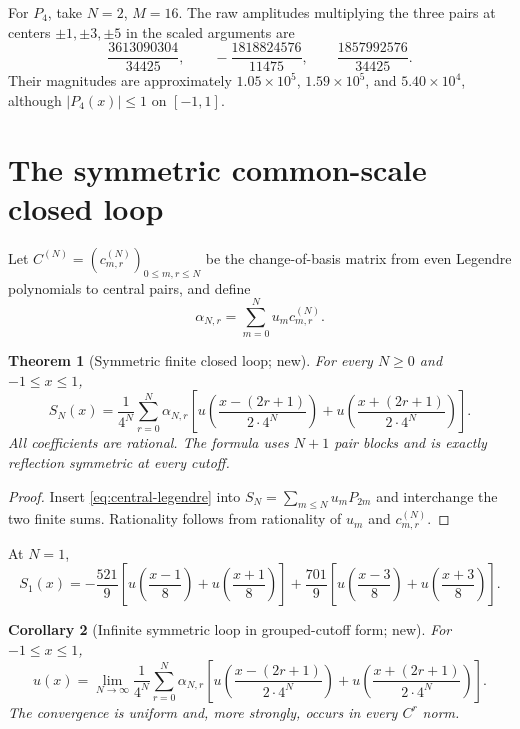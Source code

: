 \documentclass[11pt,oneside]{article}
\numberwithin{equation}{section}
\newtheorem{theorem}{Theorem}[section]
\newtheorem{corollary}[theorem]{Corollary}
\theoremstyle{definition}
\theoremstyle{remark}
\begin{document}
For $P_4$, take $N=2$, $M=16$.  The raw amplitudes multiplying the three
pairs at centers $\pm1,\pm3,\pm5$ in the scaled arguments are
\begin{equation}
 \frac{3613090304}{34425},\qquad
 -\frac{1818824576}{11475},\qquad
 \frac{1857992576}{34425}.
 \label{eq:P4-central-coeffs}
\end{equation}
Their magnitudes are approximately $1.05\times10^5$, $1.59\times10^5$, and
$5.40\times10^4$, although $|P_4(x)|\le1$ on $[-1,1]$.

\section{The symmetric common-scale closed loop}
\label{sec:symmetric-loop}

Let $C^{(N)}=(c_{m,r}^{(N)})_{0\le m,r\le N}$ be the change-of-basis matrix
from even Legendre polynomials to central pairs, and define
\begin{equation}
 \alpha_{N,r}=\sum_{m=0}^{N}u_m c_{m,r}^{(N)}.
 \label{eq:alpha-def}
\end{equation}

\begin{theorem}[Symmetric finite closed loop; new]
\label{thm:symmetric-finite-loop}
For every $N\ge0$ and $-1\le x\le1$,
\begin{equation}
 \boxed{
 S_N(x)=\frac1{4^N}\sum_{r=0}^{N}\alpha_{N,r}
 \left[
 u\!\left(\frac{x-(2r+1)}{2\cdot4^N}\right)
 +u\!\left(\frac{x+(2r+1)}{2\cdot4^N}\right)
 \right].}
 \label{eq:symmetric-finite-loop}
\end{equation}
All coefficients are rational.  The formula uses $N+1$ pair blocks and is
exactly reflection symmetric at every cutoff.
\end{theorem}

\begin{proof}
Insert \eqref{eq:central-legendre} into
$S_N=\sum_{m\le N}u_mP_{2m}$ and interchange the two finite sums.  Rationality
follows from rationality of $u_m$ and $c_{m,r}^{(N)}$.
\end{proof}

At $N=1$,
\begin{equation}
 S_1(x)=-\frac{521}{9}
 \left[u\!\left(\frac{x-1}{8}\right)+u\!\left(\frac{x+1}{8}\right)\right]
 +\frac{701}{9}
 \left[u\!\left(\frac{x-3}{8}\right)+u\!\left(\frac{x+3}{8}\right)\right].
 \label{eq:S1-central}
\end{equation}

\begin{corollary}[Infinite symmetric loop in grouped-cutoff form; new]
\label{cor:symmetric-infinite-loop}
For $-1\le x\le1$,
\begin{equation}
 \boxed{
 u(x)=\lim_{N\to\infty}\frac1{4^N}\sum_{r=0}^{N}\alpha_{N,r}
 \left[
 u\!\left(\frac{x-(2r+1)}{2\cdot4^N}\right)
 +u\!\left(\frac{x+(2r+1)}{2\cdot4^N}\right)
 \right].}
 \label{eq:symmetric-infinite-loop}
\end{equation}
The convergence is uniform and, more strongly, occurs in every $C^r$ norm.
\end{corollary}
\end{document}
